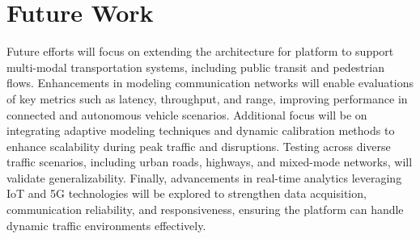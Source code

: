 

\section{Future Work}  

\noindent Future efforts will focus on extending the architecture for \digit platform to support multi-modal transportation systems, including public transit and pedestrian flows. Enhancements in modeling communication networks will enable evaluations of key metrics such as latency, throughput, and range, improving performance in connected and autonomous vehicle scenarios. Additional focus will be on integrating adaptive modeling techniques and dynamic calibration methods to enhance scalability during peak traffic and disruptions. Testing across diverse traffic scenarios, including urban roads, highways, and mixed-mode networks, will validate generalizability. Finally, advancements in real-time analytics leveraging IoT and 5G technologies will be explored to strengthen data acquisition, communication reliability, and responsiveness, ensuring the platform can handle dynamic traffic environments effectively.
